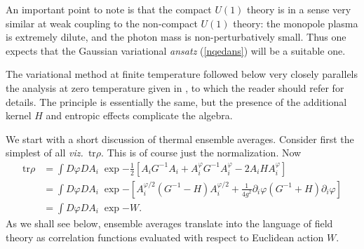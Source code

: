 \documentclass[a4paper,a4paper]{article}
\begin{document}
An important point to note is that the compact $U(1)$ theory is in a sense very similar at weak coupling 
to the non-compact $U(1)$ theory: the monopole plasma is extremely dilute, and the photon mass is non-perturbatively small.
Thus one expects that the Gaussian variational \emph{ansatz}
(\ref{nqedans}) will be a suitable one. 

The variational method at finite temperature followed below very closely parallels the analysis at zero temperature given in 
\cite{Kogan:1995vb}, to which the reader should refer for details. The principle is essentially the same, 
but the presence of the additional kernel $H$ and entropic effects complicate the algebra.

We start with a short discussion of thermal ensemble averages. Consider first the simplest of all \emph{viz.\ }$\mathrm{tr} \rho$.
This is of course just the normalization. Now 
\begin{align} \label{action}
\mathrm{tr} \rho &= \int D\varphi DA_i \; 
\exp{ -\frac{1}{2} [A_i G^{-1} A_i + A_{i}^{\varphi} G^{-1} A_{i}^{\varphi} - 2A_i H A_{i}^{\varphi}]} \nonumber \\
&= \int D\varphi DA_i \;
\exp{ - \left[ A_{i}^{\varphi /2} (G^{-1} - H) A_{i}^{\varphi /2} + \frac{1}{4g^2} \partial_i \varphi (G^{-1} + H) \partial_i \varphi \right]} \nonumber \\
&= \int D\varphi DA_i \; \exp{ - W }.
\end{align}
As we shall see below, ensemble averages translate into the language of field theory as correlation functions
evaluated with respect to Euclidean action $W$.
\end{document}

